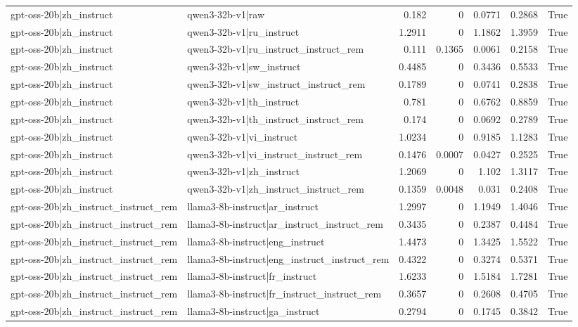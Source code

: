 \begin{table}
\begin{tabular}{l l r r r r l}
gpt-oss-20b|zh_instruct & qwen3-32b-v1|raw & 0.182 & 0 & 0.0771 & 0.2868 & True \\
gpt-oss-20b|zh_instruct & qwen3-32b-v1|ru_instruct & 1.2911 & 0 & 1.1862 & 1.3959 & True \\
gpt-oss-20b|zh_instruct & qwen3-32b-v1|ru_instruct_instruct_rem & 0.111 & 0.1365 & 0.0061 & 0.2158 & True \\
gpt-oss-20b|zh_instruct & qwen3-32b-v1|sw_instruct & 0.4485 & 0 & 0.3436 & 0.5533 & True \\
gpt-oss-20b|zh_instruct & qwen3-32b-v1|sw_instruct_instruct_rem & 0.1789 & 0 & 0.0741 & 0.2838 & True \\
gpt-oss-20b|zh_instruct & qwen3-32b-v1|th_instruct & 0.781 & 0 & 0.6762 & 0.8859 & True \\
gpt-oss-20b|zh_instruct & qwen3-32b-v1|th_instruct_instruct_rem & 0.174 & 0 & 0.0692 & 0.2789 & True \\
gpt-oss-20b|zh_instruct & qwen3-32b-v1|vi_instruct & 1.0234 & 0 & 0.9185 & 1.1283 & True \\
gpt-oss-20b|zh_instruct & qwen3-32b-v1|vi_instruct_instruct_rem & 0.1476 & 0.0007 & 0.0427 & 0.2525 & True \\
gpt-oss-20b|zh_instruct & qwen3-32b-v1|zh_instruct & 1.2069 & 0 & 1.102 & 1.3117 & True \\
gpt-oss-20b|zh_instruct & qwen3-32b-v1|zh_instruct_instruct_rem & 0.1359 & 0.0048 & 0.031 & 0.2408 & True \\
gpt-oss-20b|zh_instruct_instruct_rem & llama3-8b-instruct|ar_instruct & 1.2997 & 0 & 1.1949 & 1.4046 & True \\
gpt-oss-20b|zh_instruct_instruct_rem & llama3-8b-instruct|ar_instruct_instruct_rem & 0.3435 & 0 & 0.2387 & 0.4484 & True \\
gpt-oss-20b|zh_instruct_instruct_rem & llama3-8b-instruct|eng_instruct & 1.4473 & 0 & 1.3425 & 1.5522 & True \\
gpt-oss-20b|zh_instruct_instruct_rem & llama3-8b-instruct|eng_instruct_instruct_rem & 0.4322 & 0 & 0.3274 & 0.5371 & True \\
gpt-oss-20b|zh_instruct_instruct_rem & llama3-8b-instruct|fr_instruct & 1.6233 & 0 & 1.5184 & 1.7281 & True \\
gpt-oss-20b|zh_instruct_instruct_rem & llama3-8b-instruct|fr_instruct_instruct_rem & 0.3657 & 0 & 0.2608 & 0.4705 & True \\
gpt-oss-20b|zh_instruct_instruct_rem & llama3-8b-instruct|ga_instruct & 0.2794 & 0 & 0.1745 & 0.3842 & True \\

\end{tabular}
\end{table}
